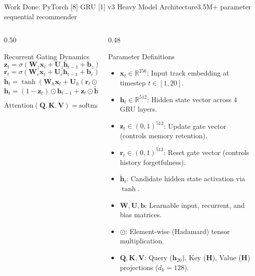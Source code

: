 \documentclass[aspectratio=169,10pt]{beamer}
\begin{document}
\begin{frame}{Work Done: PyTorch [8] GRU [1] v3 Heavy Model Architecture}{3.5M+ parameter sequential recommender}
    \begin{columns}[T]
        \begin{column}{0.50\textwidth}
            \begin{block}{Recurrent Gating Dynamics}
                \fontsize{6.5pt}{8.2pt}\selectfont
                $$\mathbf{z}_t = \sigma(\mathbf{W}_z \mathbf{x}_t + \mathbf{U}_z \mathbf{h}_{t-1} + \mathbf{b}_z)$$
                $$\mathbf{r}_t = \sigma(\mathbf{W}_r \mathbf{x}_t + \mathbf{U}_r \mathbf{h}_{t-1} + \mathbf{b}_r)$$
                $$\tilde{\mathbf{h}}_t = \tanh(\mathbf{W}_h \mathbf{x}_t + \mathbf{U}_h (\mathbf{r}_t \odot \mathbf{h}_{t-1}) + \mathbf{b}_h)$$
                $$\mathbf{h}_t = (1 - \mathbf{z}_t) \odot \mathbf{h}_{t-1} + \mathbf{z}_t \odot \tilde{\mathbf{h}}_t$$
                $$\text{Attention}(\mathbf{Q}, \mathbf{K}, \mathbf{V}) = \text{softmax}\left(\frac{\mathbf{Q}\mathbf{K}^T}{\sqrt{d_k}}\right)\mathbf{V}$$
            \end{block}
        \end{column}

        \begin{column}{0.48\textwidth}
            \begin{block}{Parameter Definitions}
                \fontsize{6pt}{7.5pt}\selectfont
                \begin{itemize}
                    \item $\mathbf{x}_t \in \mathbb{R}^{256}$: Input track embedding at timestep $t \in [1, 20]$.
                    \item $\mathbf{h}_t \in \mathbb{R}^{512}$: Hidden state vector across 4 GRU layers.
                    \item $\mathbf{z}_t \in (0,1)^{512}$: Update gate vector (controls memory retention).
                    \item $\mathbf{r}_t \in (0,1)^{512}$: Reset gate vector (controls history forgetfulness).
                    \item $\tilde{\mathbf{h}}_t$: Candidate hidden state activation via $\tanh$.
                    \item $\mathbf{W}, \mathbf{U}, \mathbf{b}$: Learnable input, recurrent, and bias matrices.
                    \item $\odot$: Element-wise (Hadamard) tensor multiplication.
                    \item $\mathbf{Q}, \mathbf{K}, \mathbf{V}$: Query ($\mathbf{h}_{20}$), Key ($\mathbf{H}$), Value ($\mathbf{H}$) projections ($d_k=128$).
                \end{itemize}
            \end{block}
        \end{column}
    \end{columns}
\end{frame}
\end{document}

